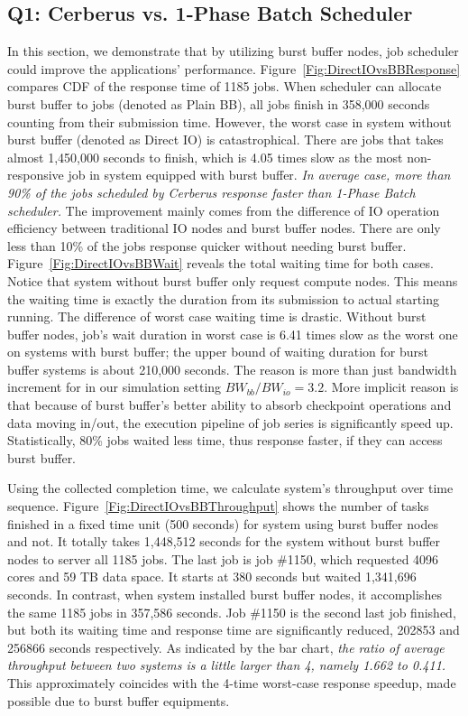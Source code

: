\subsection{Q1: Cerberus vs. 1-Phase Batch Scheduler}
\label{Sec:Sim:DirectIOvsBB}
In this section, we demonstrate that by utilizing burst buffer nodes,
job scheduler could improve the applications' performance.
Figure~\ref{Fig:DirectIOvsBBResponse} compares CDF of the response time of 1185 jobs.
When scheduler can allocate burst buffer to jobs (denoted as Plain BB),
all jobs finish in 358,000 seconds counting from their submission time.
However, the worst case in system without burst buffer
(denoted as Direct IO) is catastrophical.
There are jobs that takes almost 1,450,000 seconds to finish,
which is 4.05 times slow as the most non-responsive job
in system equipped with burst buffer.
\textit{In average case, more than 90\% of the jobs scheduled by Cerberus
response faster than 1-Phase Batch scheduler.}
The improvement mainly comes from the difference of IO operation efficiency between
traditional IO nodes and burst buffer nodes.
There are only less than 10\% of the jobs response quicker without needing burst buffer.
Figure~\ref{Fig:DirectIOvsBBWait} reveals the total waiting time for both cases.
Notice that system without burst buffer only request compute nodes.
This means the waiting time is exactly the duration
from its submission to actual starting running.
The difference of worst case waiting time is drastic.
Without burst buffer nodes, job's wait duration in worst case is 6.41 times
slow as the worst one on systems with burst buffer;
the upper bound of waiting duration for burst buffer systems is about 210,000 seconds.
The reason is more than just bandwidth increment
for in our simulation setting $BW_{bb} / BW_{io}=3.2$.
More implicit reason is that because of burst buffer's better ability to
absorb checkpoint operations and data moving in/out,
the execution pipeline of job series is significantly speed up.
Statistically, 80\% jobs waited less time, thus response faster,
if they can access burst buffer.


Using the collected completion time, we calculate system's throughput over time sequence.
Figure~\ref{Fig:DirectIOvsBBThroughput} shows the number of tasks finished
in a fixed time unit (500 seconds) for system using burst buffer nodes and not.
It totally takes 1,448,512 seconds for the system without burst buffer nodes to
server all 1185 jobs.
The last job is job \#1150, which requested 4096 cores and 59 TB data space.
It starts at 380 seconds but waited 1,341,696 seconds.
In contrast, when system installed burst buffer nodes,
it accomplishes the same 1185 jobs in 357,586 seconds.
Job \#1150 is the second last job finished, but both its waiting time and response time
are significantly reduced, 202853 and 256866 seconds respectively.
As indicated by the bar chart,
\textit{the ratio of average throughput between two systems is a little larger than 4, namely 1.662 to 0.411.}
This approximately coincides with the 4-time worst-case response speedup,
made possible due to burst buffer equipments.

